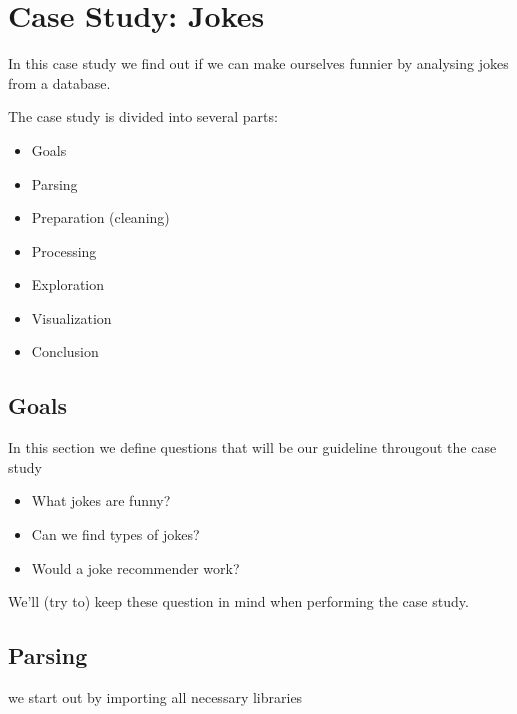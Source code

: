 \documentclass[letterpaper,10pt,english]{jupyterBook}
\begin{document}
\chapter{Case Study: Jokes}
\label{\detokenize{c7_case_studies/Jokes:case-study-jokes}}\label{\detokenize{c7_case_studies/Jokes::doc}}
\sphinxAtStartPar
In this case study we find out if we can make ourselves funnier by analysing jokes from a database.

\sphinxAtStartPar
The case study is divided into several parts:
\begin{itemize}
\item {} 
\sphinxAtStartPar
Goals

\item {} 
\sphinxAtStartPar
Parsing

\item {} 
\sphinxAtStartPar
Preparation (cleaning)

\item {} 
\sphinxAtStartPar
Processing

\item {} 
\sphinxAtStartPar
Exploration

\item {} 
\sphinxAtStartPar
Visualization

\item {} 
\sphinxAtStartPar
Conclusion

\end{itemize}


\section{Goals}
\label{\detokenize{c7_case_studies/Jokes:goals}}
\sphinxAtStartPar
In this section we define questions that will be our guideline througout the case study
\begin{itemize}
\item {} 
\sphinxAtStartPar
What jokes are funny?

\item {} 
\sphinxAtStartPar
Can we find types of jokes?

\item {} 
\sphinxAtStartPar
Would a joke recommender work?

\end{itemize}

\sphinxAtStartPar
We’ll (try to) keep these question in mind when performing the case study.


\section{Parsing}
\label{\detokenize{c7_case_studies/Jokes:parsing}}
\sphinxAtStartPar
we start out by importing all necessary libraries
\end{document}
